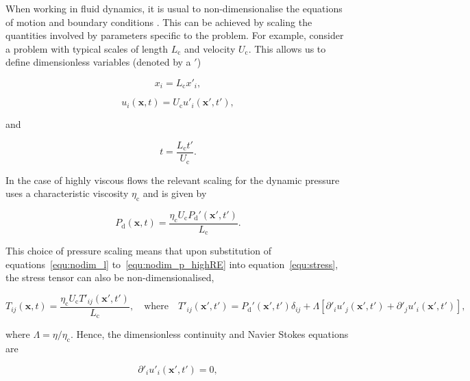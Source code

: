 \documentclass[12pt]{article}
\begin{document}
When working in fluid dynamics, it is usual to non-dimensionalise the equations of motion and boundary conditions \citep{White99}. This can be achieved by scaling the quantities involved by parameters specific to the problem. For example, consider a problem with typical scales of length $L_{\text{c}}$ and velocity $U_{\text{c}}$. This allows us to define dimensionless variables (denoted by a $'$)

\begin{equation} 
\label{equ:nodim_l}
x_{i} = L_{\text{c}} x'_{i} ,
\end{equation}

\begin{equation}
\label{equ:nodim_u}
u_{i}(\boldsymbol{x},t) = U_{\text{c}} u'_{i}(\boldsymbol{x'},t') ,
\end{equation}

and 

\begin{equation}
\label{equ:nodim_t}
t = \frac{L_{\text{c}} t'}{U_{\text{c}}}.
\end{equation}

In the case of highly viscous flows the relevant scaling for the dynamic pressure uses a characteristic viscosity $\eta_{\text{c}}$ and is given by \citep{Lee82}

\begin{equation}
\label{equ:nodim_p_highRE}
P_{\text{d}}(\boldsymbol{x},t) = \frac{\eta_{\text{c}} U_{\text{c}} P_{\text{d}}'(\boldsymbol{x'},t')}{L_{\text{c}}} .
\end{equation}

This choice of pressure scaling means that upon substitution of equations~\ref{equ:nodim_l} to~\ref{equ:nodim_p_highRE} into equation~\ref{equ:stress}, the stress tensor can also be non-dimensionalised,

\begin{equation}
\label{equ:nodim_T}
T_{ij}(\boldsymbol{x},t) = \frac{\eta_{\text{c}} U_{\text{c}} T'_{ij}(\boldsymbol{x'},t')}{L_{\text{c}}}, \quad \text{where} \quad T'_{ij}(\boldsymbol{x'},t') = P_{\text{d}}'(\boldsymbol{x'},t') \delta_{ij} + \Lambda [\partial'_{i} u'_{j}(\boldsymbol{x'},t') + \partial'_{j} u'_{i}(\boldsymbol{x'},t')] ,
\end{equation}

where $\Lambda = \eta / \eta_{\text{c}}$. Hence, the dimensionless continuity and Navier Stokes equations are

\begin{equation}
\label{equ:nodim_cont}
\partial'_{i} u'_{i}(\boldsymbol{x'},t') = 0,
\end{equation}
\end{document}
